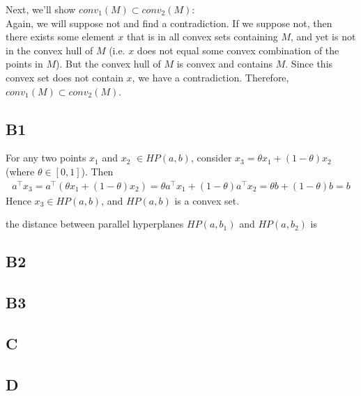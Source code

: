 Next, we'll show $conv_1(M) \subset conv_2(M)$:\\ Again, we will suppose not
and find a contradiction. If we suppose not, then there exists some element $x$
that is in all convex sets containing $M$, and yet is not in the convex hull of
$M$ (i.e. $x$ does not equal some convex combination of the points in $M$). But
the convex hull of $M$ is convex and contains $M$.  Since this convex set does
not contain $x$, we have a contradiction. Therefore, $conv_1(M) \subset
conv_2(M)$.


\subsection{B1}
For any two points $x_1$ and $x_2$ $\in HP(a,b)$, consider $x_3 = \theta x_1 +
(1-\theta) x_2$ (where $\theta \in [0,1]$). Then
\begin{align}
    a^{\top} x_3 = a^{\top} (\theta x_1 + (1-\theta) x_2) = \theta a^{\top} x_1
    + (1-\theta) a^{\top} x_2 = \theta b + (1-\theta) b = b
\end{align}
Hence $x_3 \in HP(a,b)$, and $HP(a,b)$ is a convex set.

the distance between parallel hyperplanes $HP(a,b_1)$ and $HP(a,b_2)$ is 


\subsection{B2}


\subsection{B3}


\subsection{C}


\subsection{D}




